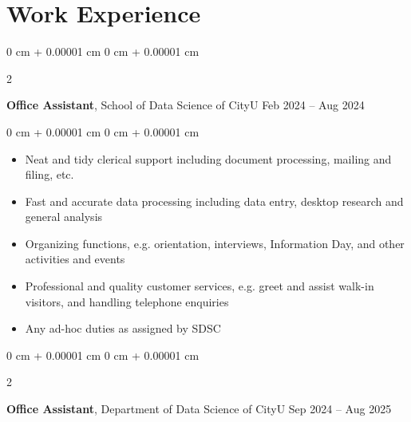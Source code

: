 \documentclass[10pt, letterpaper]{article}
\newenvironment{highlights}{
    \begin{itemize}[
        topsep=0.10 cm,
        parsep=0.10 cm,
        partopsep=0pt,
        itemsep=0pt,
        leftmargin=0 cm + 10pt
    ]
}{
    \end{itemize}
} %
\newenvironment{onecolentry}{
    \begin{adjustwidth}{
        0 cm + 0.00001 cm
    }{
        0 cm + 0.00001 cm
    }
}{
    \end{adjustwidth}
} %
\newenvironment{twocolentry}[2][]{
    \onecolentry
    \def\secondColumn{#2}
    \setcolumnwidth{\fill, 4.5 cm}
    \begin{paracol}{2}
}{
    \switchcolumn \raggedleft \secondColumn
    \end{paracol}
    \endonecolentry
} %
\begin{document}
        \vspace{0.2 cm}
        
    \section{ Work Experience}



        
        \begin{twocolentry}{
            Feb 2024 – Aug 2024
        }
            \textbf{Office Assistant}, School of Data Science of CityU\end{twocolentry}

        \vspace{0.10 cm}
        \begin{onecolentry}
            \begin{highlights}
                \item Neat and tidy clerical support including document processing, mailing and filing, etc.
                \item Fast and accurate data processing including data entry, desktop research and general analysis
                \item Organizing functions, e.g. orientation, interviews, Information Day, and other activities and events
                \item Professional and quality customer services, e.g. greet and assist walk-in visitors, and handling telephone enquiries
                \item Any ad-hoc duties as assigned by SDSC

            \end{highlights}
        \end{onecolentry}


        \vspace{0.2 cm}
        
 \begin{twocolentry}{
            Sep 2024 – Aug 2025
        }
            \textbf{Office Assistant}, Department of Data Science of CityU\end{twocolentry}
\end{document}
